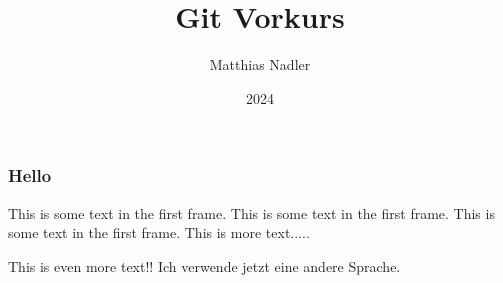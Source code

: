 \documentclass{beamer}
\title{Git Vorkurs}
\author{Matthias Nadler}
\institute{Uni Basel}
\date{2024}
\begin{document}
\frame{\titlepage}

\begin{frame}
\frametitle{Hello}
This is some text in the first frame. This is some text in the first frame. This is some text in the first frame.
This is more text.....

This is even more text!!
Ich verwende jetzt eine andere Sprache. 

\end{frame}
\end{document}
